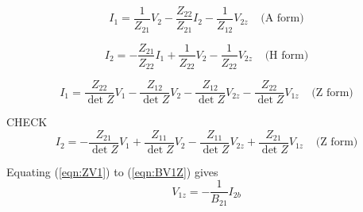 \documentclass[a4paper, 12pt]{article}
\newcommand{\bigspace}{\;\;\;\;}
\newcommand{\refeqn}[1]{\mbox{(\ref{eqn:#1})}}
\begin{document}
\begin{equation}
  I_1 = \frac{1}{Z_{21}} V_2 - \frac{Z_{22}}{Z_{21}} I_2 - \frac{1}{Z_{12}} V_{2z} \bigspace \mbox{(A form)}
\end{equation}


\begin{equation}
  I_2 = -\frac{Z_{21}}{Z_{22}} I_1 + \frac{1}{Z_{22}} V_2 - \frac{1}{Z_{22}} V_{2z} \bigspace \mbox{(H form)}
\end{equation}


\begin{equation}
  I_1 = \frac{Z_{22}}{\det{Z}} V_1 - \frac{Z_{12}}{\det{Z}} V_2 - \frac{Z_{12}}{\det{Z}} V_{2z} - \frac{Z_{22}}{\det{Z}} V_{1z} \bigspace \mbox{(Z form)}
\end{equation}

CHECK
\begin{equation}
  I_2 = -\frac{Z_{21}}{\det{Z}} V_1 + \frac{Z_{11}}{\det{Z}} V_2 - \frac{Z_{11}}{\det{Z}} V_{2z} + \frac{Z_{21}}{\det{Z}} V_{1z} \bigspace \mbox{(Z form)}
\end{equation}


Equating \refeqn{ZV1} to \refeqn{BV1Z} gives
%
\begin{equation}
  V_{1z} = -\frac{1}{B_{21}} I_{2b}
\end{equation}





\end{document}
